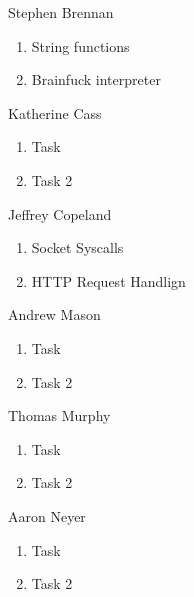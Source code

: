 \documentclass[journal,10pt]{IEEEtran}
\begin{document}
\begin{LaTeXitemize} \itemsep0pt \parskip0pt
  \item Stephen Brennan
  \begin{enumerate}
    \item String functions
    \item Brainfuck interpreter
  \end{enumerate}

  \item Katherine Cass
  \begin{enumerate}
    \item Task
    \item Task 2
  \end{enumerate}

  \item Jeffrey Copeland
  \begin{enumerate}
    \item Socket Syscalls
    \item HTTP Request Handlign
  \end{enumerate}

  \item Andrew Mason
  \begin{enumerate}
    \item Task
    \item Task 2
  \end{enumerate}

  \item Thomas Murphy
  \begin{enumerate}
    \item Task
    \item Task 2
  \end{enumerate}

  \item Aaron Neyer
  \begin{enumerate}
    \item Task
    \item Task 2
  \end{enumerate}

\end{LaTeXitemize}

%
%
\end{document}
